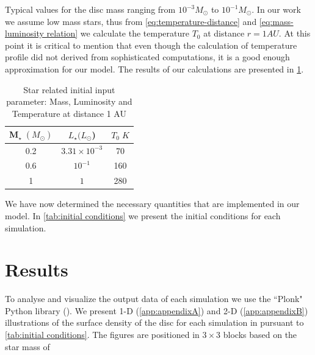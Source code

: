 \documentclass[aps,prb,twocolumn,superscriptaddress,floatfix,longbibliography]{revtex4-2}
\newcounter{para}
\begin{document}
Typical values for the disc mass ranging from $10^{-3}M_{\odot}$ to $10^{-1}M_{\odot}$. In our work we assume low mass stars, thus from \eqref{eq:temperature-distance} and \eqref{eq:mass-luminosity relation} we calculate the temperature $T_0$ at distance $r=1 AU$. At this point it is critical to mention that even though the calculation of temperature profile did not derived from sophisticated computations, it is a good enough approximation for our model. The results of our calculations are presented in \cref{tab:star related initial conditions}.
\begin{table}[ht]
\centering
  \begin{tabular}{ ccc}
  \hline
   M$_{\star} \; (M_{\odot})$ & $L_{\star} (L_{\odot}$) &$T_{0} \; K$\\
  \hline \hline
  0.2  & $3.31 \times 10^{-3}$ & 70\\
  0.6 & $10^{-1}$ & 160\\
  1 & $1$ & 280\\
  \hline
  \end{tabular}
\caption{Star related initial input parameter: Mass, Luminosity and Temperature at distance 1 AU}\label{tab:star related initial conditions}
\end{table}

We have now determined the necessary quantities that are implemented in our model. In \cref{tab:initial conditions} we present the initial conditions for each simulation.
\section{Results}
To analyse and visualize the output data of each simulation we use the ``Plonk" Python library (\cite{2019JOSS....4.1884M}). We present 1-D (\cref{app:appendixA}) and 2-D (\cref{app:appendixB}) illustrations of the surface density of the disc for each simulation in pursuant to  \cref{tab:initial conditions}. The figures are positioned in $3 \times 3$ blocks based on the star mass of 
\end{document}
